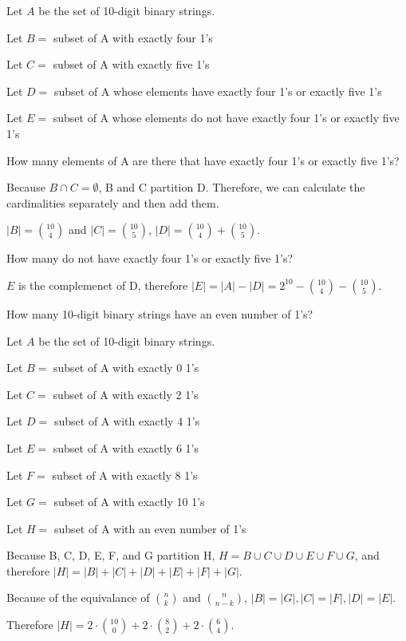 \documentclass[openany, 12pt]{book}
\begin{document}
\begin{exercise}{}{}
	Let $A$ be the set of 10-digit binary strings.
	\begin{alist}
		\item Let $B=$ subset of A with exactly four 1's
		\item Let $C=$ subset of A with exactly five 1's
		\item Let $D=$ subset of A whose elements have exactly four 1's or exactly five 1's
		\item Let $E=$ subset of A whose elements do not have exactly four 1's
		or exactly five 1's
		\item How many elements of A are there that have exactly four 1's or exactly five 1's?
		\item Because $B \cap C=\emptyset$, B and C partition D. Therefore, we can
		calculate the cardinalities separately and then add them.
		\item $|B|=\binom{10}{4}$ and $|C|=\binom{10}{5}$, $|D|= \binom{10}{4}+\binom{10}{5}$.
		\item How many do not have exactly four 1's or exactly five 1's?
		\item $E$ is the complemenet of D, therefore $|E| = |A| - |D| = 2^{10} -
			\binom{10}{4}-\binom{10}{5}$.
	\end{alist}
\end{exercise}

\begin{exercise}{}{}
	How many 10-digit binary strings have an even number of 1's?
	\begin{alist}
		\item Let $A$ be the set of 10-digit binary strings.
		\item Let $B=$ subset of A with exactly 0 1's
		\item Let $C=$ subset of A with exactly 2 1's
		\item Let $D=$ subset of A with exactly 4 1's
		\item Let $E=$ subset of A with exactly 6 1's
		\item Let $F=$ subset of A with exactly 8 1's
		\item Let $G=$ subset of A with exactly 10 1's
		\item Let $H=$ subset of A with an even number of 1's
		\item Because B, C, D, E, F, and G partition H, $H=B\cup C\cup D\cup E \cup
			F \cup G$, and therefore $|H|=|B| + |C| + |D| + |E| + |F| + |G|$.
		\item Because of the equivalance of $\binom{n}{k}$ and $\binom{n}{n-k}$,
		$|B|=|G|, |C|=|F|, |D|=|E|$.
		\item Therefore $|H| =
			2\cdot \binom{10}{0} +
			2\cdot \binom{8}{2} +
			2\cdot \binom{6}{4}$.
	\end{alist}
\end{exercise}
\end{document}
